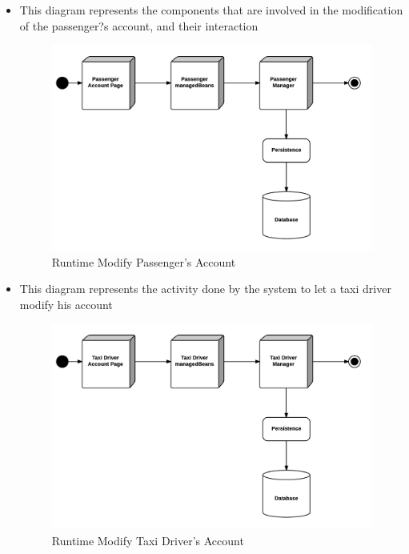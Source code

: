\begin{itemize}
	\item This diagram represents the components that are involved in the modification of the passenger?s account, and their interaction
	\begin{figure}[htbp]
	\centering
	\includegraphics[width=\textwidth]{cpt/img/RuntimeModifyPageView}
	\caption{Runtime Modify Passenger's Account}
	\end{figure}
	\clearpage
	
	\item This diagram represents the activity done by the system to let a taxi driver modify his account
	\begin{figure}[htbp]
	\centering
	\includegraphics[width=\textwidth]{cpt/img/RuntimeModifyPageTaxidriverView}
	\caption{Runtime Modify Taxi Driver's Account}
	\end{figure}
	\clearpage
	

\end{itemize}
